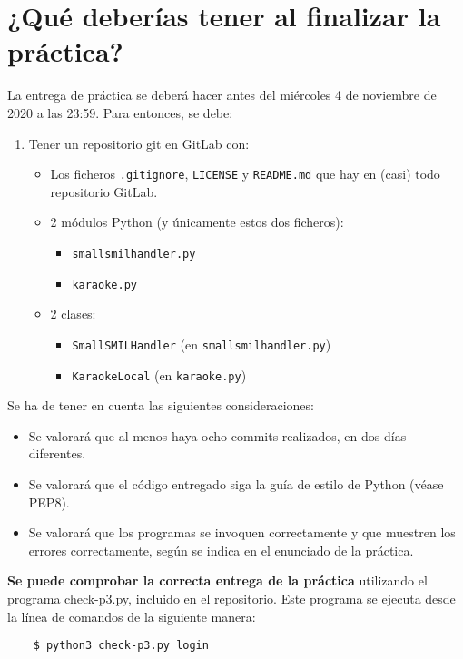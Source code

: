 \documentclass[11pt,a4paper]{article}
\begin{document}
\section{¿Qué deberías tener al finalizar la práctica?}

La entrega de práctica se deberá hacer antes del miércoles 4 de noviembre de 2020 a las 23:59. Para entonces, se debe: 

\begin{enumerate}
  \item Tener un repositorio git en GitLab con:
  \begin{itemize}
    \item Los ficheros \texttt{.gitignore}, \texttt{LICENSE} y \texttt{README.md} que hay en (casi) todo repositorio GitLab.
    \item 2 módulos Python (y únicamente estos dos ficheros):
    \begin{itemize}
      \item \texttt{smallsmilhandler.py}
      \item \texttt{karaoke.py}
    \end{itemize}
    \item 2 clases:
    \begin{itemize}
      \item \texttt{SmallSMILHandler} (en \texttt{smallsmilhandler.py})
      \item \texttt{KaraokeLocal} (en \texttt{karaoke.py})
    \end{itemize}
  \end{itemize}
\end{enumerate}

Se ha de tener en cuenta las siguientes consideraciones:
\begin{itemize}
  \item Se valorará que al menos haya ocho commits realizados, en dos días diferentes.
  \item Se valorará que el código entregado siga la guía de estilo de Python (véase PEP8).
  \item Se valorará que los programas se invoquen correctamente y que muestren los errores correctamente, según se indica en el enunciado de la práctica.
\end{itemize}

{\bf Se puede comprobar la correcta entrega de la práctica} utilizando el programa check-p3.py, incluido en el repositorio. Este programa se ejecuta desde la línea de comandos de la siguiente manera:
\begin{verbatim}
	$ python3 check-p3.py login
\end{verbatim}
\end{document}
